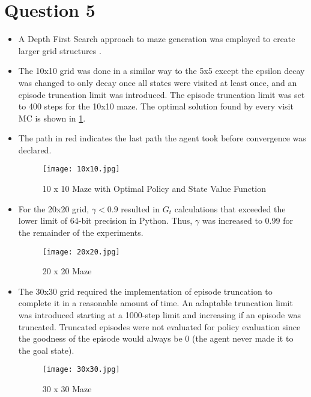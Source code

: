 \documentclass[letterpaper]{article} %
\begin{document}
\section{Question 5}
	\begin{itemize}
	    \item A Depth First Search approach to maze generation was employed to create larger grid structures \cite{CopeMazeGenerationDFS}.
	    \item The 10x10 grid was done in a similar way to the 5x5 except the epsilon decay was changed to only decay once all states were visited at least once, and an episode truncation limit was introduced. The episode truncation limit was set to 400 steps for the 10x10 maze. The optimal solution found by every visit MC is shown in \ref{fig:10x10_solution}.
	    \item The path in red indicates the last path the agent took before convergence was declared.

	    \begin{figure}[htbp]
	      \centering
	      \texttt{[image: 10x10.jpg]}
		\caption{10 x 10 Maze with Optimal Policy and State Value Function}
	      \label{fig:10x10_solution}
	    \end{figure}

	    \item For the 20x20 grid, $\gamma < 0.9$ resulted in $G_t$ calculations that exceeded the lower limit of 64-bit precision in Python. Thus, $\gamma$ was increased to $0.99$ for the remainder of the experiments.

	    \begin{figure}[htbp]
	      \centering
	      \texttt{[image: 20x20.jpg]}
		\caption{20 x 20 Maze}
	      \label{fig:20x20_solution}
	    \end{figure}

	    \item The 30x30 grid required the implementation of episode truncation to complete it in a reasonable amount of time. An adaptable truncation limit was introduced starting at a 1000-step limit and increasing if an episode was truncated. Truncated episodes were not evaluated for policy evaluation since the goodness of the episode would always be 0 (the agent never made it to the goal state).

	    \begin{figure}[htbp]
	      \centering
	      \texttt{[image: 30x30.jpg]}
		\caption{30 x 30 Maze}
	      \label{fig:30x30_solution}
	    \end{figure}


\end{itemize}
\end{document}
